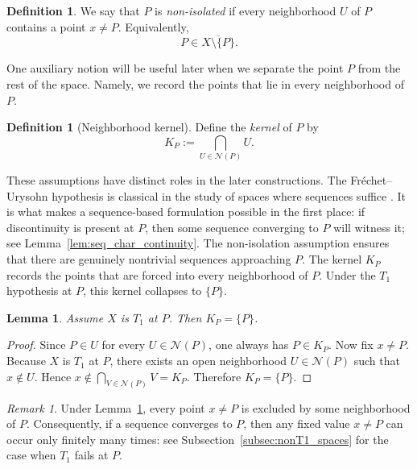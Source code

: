 \documentclass[11pt]{amsart}
\theoremstyle{plain}
\newtheorem{lemma}[theorem]{Lemma}
\theoremstyle{definition}
\newtheorem{definition}[theorem]{Definition}
\theoremstyle{remark}
\newtheorem{remark}[theorem]{Remark}
\newcommand{\cl}[1]{\overline{#1}}
\begin{document}
\begin{definition}\label{def:nonisolated}
We say that $P$ is \emph{non-isolated} if every neighborhood $U$ of $P$ contains a point $x\neq P$.
Equivalently,
\[
P\in\cl{X\setminus\{P\}}.
\]
\end{definition}

One auxiliary notion will be useful later when we separate the point $P$ from the rest of the space.
Namely, we record the points that lie in every neighborhood of $P$.

\begin{definition}[Neighborhood kernel]\label{def:kernel}
Define the \emph{kernel} of $P$ by
\[
K_P:=\bigcap_{U\in\mathcal N(P)}U.
\]
\end{definition}

These assumptions have distinct roles in the later constructions.
The Fr\'echet--Urysohn hypothesis is classical in the study of spaces where sequences suffice \cite{Fra65}.
It is what makes a sequence-based formulation possible in the first place:
if discontinuity is present at $P$, then some sequence converging to $P$ will witness it; see Lemma~\ref{lem:seq_char_continuity}.
The non-isolation assumption ensures that there are genuinely nontrivial sequences approaching $P$.
The kernel $K_P$ records the points that are forced into every neighborhood of $P$.
Under the $T_1$ hypothesis at $P$, this kernel collapses to $\{P\}$.

\begin{lemma}\label{lem:kernel_T1}
Assume $X$ is $T_1$ at $P$.
Then $K_P=\{P\}$.

\end{lemma}

\begin{proof}
Since $P\in U$ for every $U\in\mathcal N(P)$, one always has $P\in K_P$.
Now fix $x\neq P$.
Because $X$ is $T_1$ at $P$, there exists an open neighborhood $U\in\mathcal N(P)$ such that $x\notin U$.
Hence $x\notin \bigcap_{V\in\mathcal N(P)}V=K_P$.
Therefore $K_P=\{P\}$.
\end{proof}

\begin{remark}\label{rem:kernel_consequence}
Under Lemma~\ref{lem:kernel_T1}, every point $x\neq P$ is excluded by some neighborhood of $P$.
Consequently, if a sequence converges to $P$, then any fixed value $x\neq P$ can occur only finitely many times: see Subsection~\ref{subsec:nonT1_spaces} for the case when $T_1$ fails at $P$.
\end{remark}
\end{document}
